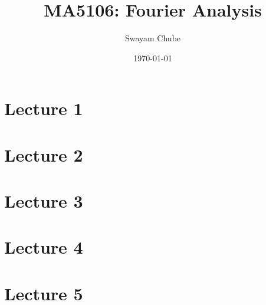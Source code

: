 \documentclass{report}
\title{MA5106: Fourier Analysis}
\author{Swayam Chube}
\date{\today}
\begin{document}
\maketitle

\tableofcontents

\chapter{Lecture 1}


\chapter{Lecture 2}


\chapter{Lecture 3}


\chapter{Lecture 4}


\chapter{Lecture 5}

\end{document}
